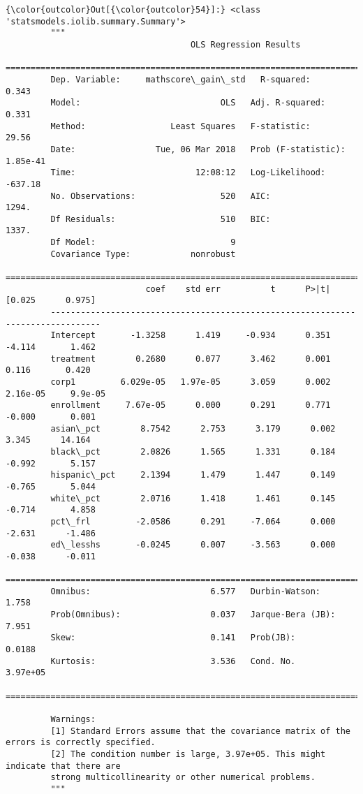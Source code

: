 \documentclass[11pt]{article}
\begin{document}
\begin{Verbatim}[commandchars=\\\{\}]
{\color{outcolor}Out[{\color{outcolor}54}]:} <class 'statsmodels.iolib.summary.Summary'>
         """
                                     OLS Regression Results                            
         ==============================================================================
         Dep. Variable:     mathscore\_gain\_std   R-squared:                       0.343
         Model:                            OLS   Adj. R-squared:                  0.331
         Method:                 Least Squares   F-statistic:                     29.56
         Date:                Tue, 06 Mar 2018   Prob (F-statistic):           1.85e-41
         Time:                        12:08:12   Log-Likelihood:                -637.18
         No. Observations:                 520   AIC:                             1294.
         Df Residuals:                     510   BIC:                             1337.
         Df Model:                           9                                         
         Covariance Type:            nonrobust                                         
         ================================================================================
                            coef    std err          t      P>|t|      [0.025      0.975]
         --------------------------------------------------------------------------------
         Intercept       -1.3258      1.419     -0.934      0.351      -4.114       1.462
         treatment        0.2680      0.077      3.462      0.001       0.116       0.420
         corp1         6.029e-05   1.97e-05      3.059      0.002    2.16e-05     9.9e-05
         enrollment     7.67e-05      0.000      0.291      0.771      -0.000       0.001
         asian\_pct        8.7542      2.753      3.179      0.002       3.345      14.164
         black\_pct        2.0826      1.565      1.331      0.184      -0.992       5.157
         hispanic\_pct     2.1394      1.479      1.447      0.149      -0.765       5.044
         white\_pct        2.0716      1.418      1.461      0.145      -0.714       4.858
         pct\_frl         -2.0586      0.291     -7.064      0.000      -2.631      -1.486
         ed\_lesshs       -0.0245      0.007     -3.563      0.000      -0.038      -0.011
         ==============================================================================
         Omnibus:                        6.577   Durbin-Watson:                   1.758
         Prob(Omnibus):                  0.037   Jarque-Bera (JB):                7.951
         Skew:                           0.141   Prob(JB):                       0.0188
         Kurtosis:                       3.536   Cond. No.                     3.97e+05
         ==============================================================================
         
         Warnings:
         [1] Standard Errors assume that the covariance matrix of the errors is correctly specified.
         [2] The condition number is large, 3.97e+05. This might indicate that there are
         strong multicollinearity or other numerical problems.
         """
\end{Verbatim}
            
\end{document}
